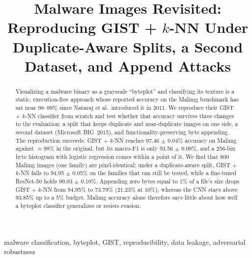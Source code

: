 \documentclass[conference]{IEEEtran}
\begin{document}
\title{Malware Images Revisited: Reproducing GIST + $k$-NN Under Duplicate-Aware Splits, a Second Dataset, and Append Attacks}
\author{
}
\maketitle

\begin{abstract}
Visualizing a malware binary as a grayscale ``byteplot'' and classifying its texture
is a static, execution-free approach whose reported accuracy on the Malimg benchmark
has sat near 98--99\% since Nataraj et al.\ introduced it in 2011. We reproduce their
GIST + $k$-NN classifier from scratch and test whether that accuracy survives three
changes to the evaluation: a split that keeps duplicate and near-duplicate images on
one side, a second dataset (Microsoft BIG~2015), and functionality-preserving byte
appending. The reproduction succeeds:
GIST + $k$-NN reaches 97.46 $\pm$ 0.04\% accuracy on Malimg against $\approx$98\% in the
original, but its macro-F1 is only
93.56 $\pm$ 0.09\%, and a 256-bin byte histogram with logistic regression comes within
a point of it. We find that 800 Malimg images (one family) are pixel-identical; under a
duplicate-aware split, GIST + $k$-NN falls to
94.95 $\pm$ 0.05\% on the families that can still be tested, while a
fine-tuned ResNet-50 holds
99.03 $\pm$ 0.10\%. Appending zero bytes equal to 1\% of a file's size drops
GIST + $k$-NN from
94.95\% to 73.79\% (21.23\% at 10\%), whereas the CNN stays
above
93.85\% up to a 5\% budget. Malimg accuracy alone therefore says
little about how well a byteplot classifier generalizes or resists evasion.
\end{abstract}

\begin{IEEEkeywords}
malware classification, byteplot, GIST, reproducibility, data leakage, adversarial robustness
\end{IEEEkeywords}
\end{document}
